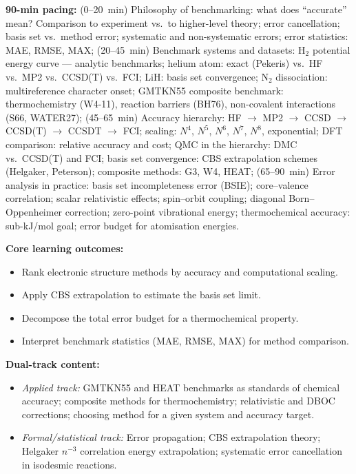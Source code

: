 \documentclass[11pt,a4paper]{article}
\begin{document}
\begin{tcolorbox}[modulebox, title={Module~II.1 --- Lecture L11: Benchmark Systems and Accuracy Hierarchies}]
\textbf{90-min pacing:} (0--20~min) Philosophy of benchmarking: what does ``accurate'' mean?
Comparison to experiment vs.\ to higher-level theory; error cancellation; basis set vs.\
method error; systematic and non-systematic errors; error statistics: MAE, RMSE, MAX;
(20--45~min) Benchmark systems and datasets:
H$_2$ potential energy curve --- analytic benchmarks;
helium atom: exact (Pekeris) vs.\ HF vs.\ MP2 vs.\ CCSD(T) vs.\ FCI;
LiH: basis set convergence; N$_2$ dissociation: multireference character onset;
GMTKN55 composite benchmark: thermochemistry (W4-11), reaction barriers (BH76),
non-covalent interactions (S66, WATER27);
(45--65~min) Accuracy hierarchy:
HF $\to$ MP2 $\to$ CCSD $\to$ CCSD(T) $\to$ CCSDT $\to$ FCI;
scaling: $N^4$, $N^5$, $N^6$, $N^7$, $N^8$, exponential;
DFT comparison: relative accuracy and cost;
QMC in the hierarchy: DMC vs.\ CCSD(T) and FCI;
basis set convergence: CBS extrapolation schemes (Helgaker, Peterson);
composite methods: G3, W4, HEAT;
(65--90~min) Error analysis in practice: basis set incompleteness error (BSIE);
core--valence correlation; scalar relativistic effects; spin--orbit coupling;
diagonal Born--Oppenheimer correction; zero-point vibrational energy;
thermochemical accuracy: sub-kJ/mol goal; error budget for atomisation energies.

\medskip\textbf{Core learning outcomes:}
\begin{itemize}[leftmargin=1.4em,topsep=2pt,itemsep=1pt]
  \item Rank electronic structure methods by accuracy and computational scaling.
  \item Apply CBS extrapolation to estimate the basis set limit.
  \item Decompose the total error budget for a thermochemical property.
  \item Interpret benchmark statistics (MAE, RMSE, MAX) for method comparison.
\end{itemize}

\medskip\textbf{Dual-track content:}
\begin{itemize}[leftmargin=1.4em,topsep=2pt,itemsep=1pt]
  \item \textit{Applied track:} GMTKN55 and HEAT benchmarks as standards of chemical accuracy;
    composite methods for thermochemistry; relativistic and DBOC corrections; choosing
    method for a given system and accuracy target.
  \item \textit{Formal/statistical track:} Error propagation; CBS extrapolation theory;
    Helgaker $n^{-3}$ correlation energy extrapolation; systematic error cancellation
    in isodesmic reactions.
\end{itemize}


\end{tcolorbox}
\end{document}
